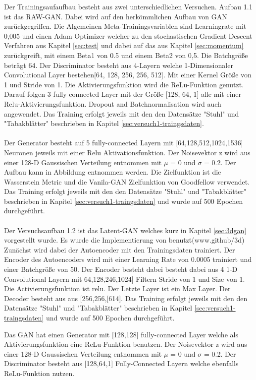 \documentclass{llncs}
\begin{document}
Der Trainingsaufaufbau besteht aus zwei unterschiedlichen Versuchen. Aufbau 1.1 ist das RAW-GAN. Dabei wird auf den herkömmlichen Aufbau von GAN zurückgegriffen. Die Algemeinen Meta-Trainingsvariablen sind Learningrate mit 0,005 und einen Adam Optimizer welcher zu den stochastischen Gradient Descent Verfahren aus Kapitel \ref{sec:test} und dabei auf das aus Kapitel \ref{sec:momentum} zurückgreift, mit einem Beta1 von 0.5 und einem Beta2 von 0,5. Die Batchgröße beträgt 64. Der Discriminator besteht aus 4-Layern welche 1-Dimensionaler Convolutional Layer bestehen[64, 128, 256, 256, 512]. Mit einer Kernel Größe von 1 und Stride von 1. Die Aktivierungsfunktion wird die ReLu-Funktion genutzt. Darauf folgen 3 fully-connected-Layer mit der Größe [128, 64, 1] alle mit einer Relu-Aktivierungsfunktion. Dropout and Batchnormalisation wird auch angewendet. Das Training erfolgt jeweils mit den den Datensätze "Stuhl" und "Tabakblätter" beschrieben in Kapitel \ref{sec:versuch1-traingsdaten}.
\\\\
Der Generator besteht auf 5 fully-connected Layern mit [64,128,512,1024,1536] Neuronen jeweils mit einer Relu Aktivationsfunktion.  Der Noisevektor z wird aus einer 128-D Gaussischen Verteilung entnommen mit $\mu$ =  0 und $\sigma$ =  0.2. Der Aufbau kann in Abbildung entnommen werden. Die Zielfunktion ist die Wasserstein Metric und die Vanila-GAN Zielfunktion von Goodfellow verwendet\cite{goodfellow2014}. Das Training erfolgt jeweils mit den den Datensätze "Stuhl" und "Tabakblätter" beschrieben in Kapitel \ref{sec:versuch1-traingsdaten} und wurde auf 500 Epochen durchgeführt.
\\\\
Der Versuchsaufbau 1.2 ist das Latent-GAN welches kurz in Kapitel \ref{sec:3dgan} vorgestellt wurde. Es wurde die Implementierung von \cite{3dgan} benutzt(www.github/3d) Zunächst wird dabei der Autoencoder mit den Trainingsdaten trainiert. Der Encoder des Autoencoders wird mit einer Learning Rate von 0.0005 trainiert und einer Batchgröße von 50. Der Encoder besteht dabei besteht dabei aus 4 1-D Convolutional Layern mit 64,128,246,1024] Filtern Stride von 1 und Size von 1. Die Activierungsfunktion ist relu. Der Letzte Layer ist ein Max Layer. Der Decoder besteht aus aus [256,256,[614]. Das Training erfolgt jeweils mit den den Datensätze "Stuhl" und "Tabakblätter" beschrieben in Kapitel \ref{sec:versuch1-traingsdaten} und wurde auf 500 Epochen durchgeführt.  

Das GAN hat einen Generator mit [128,128] fully-connected Layer welche als Aktivierungsfunktion eine ReLu-Funktion benutzen. Der Noisevektor z wird aus einer 128-D Gaussischen Verteilung entnommen mit $\mu$ =  0 und $\sigma$ =  0.2. Der Discriminator besteht aus [128,64,1] Fully-Connected Layern welche ebenfalls ReLu-Funktion nutzen. 
\end{document}
